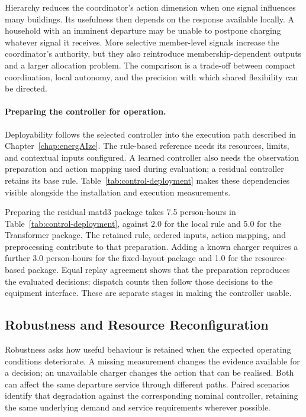 Hierarchy reduces the coordinator's action dimension when one signal influences many buildings. Its usefulness then depends on the response available locally. A household with an imminent departure may be unable to postpone charging whatever signal it receives. More selective member-level signals increase the coordinator's authority, but they also reintroduce membership-dependent outputs and a larger allocation problem. The comparison is a trade-off between compact coordination, local autonomy, and the precision with which shared flexibility can be directed.

\paragraph{Preparing the controller for operation.}
Deployability follows the selected controller into the execution path described in Chapter~\ref{chap:energAIze}. The rule-based reference needs its resources, limits, and contextual inputs configured. A learned controller also needs the observation preparation and action mapping used during evaluation; a residual controller retains its base rule. Table~\ref{tab:control-deployment} makes these dependencies visible alongside the installation and execution measurements.



\illustrativereading Preparing the residual \gls{matd3} package takes 7.5 person-hours in Table~\ref{tab:control-deployment}, against 2.0 for the local rule and 5.0 for the Transformer package. The retained rule, ordered inputs, action mapping, and preprocessing contribute to that preparation. Adding a known charger requires a further 3.0 person-hours for the fixed-layout package and 1.0 for the resource-based package. Equal replay agreement shows that the preparation reproduces the evaluated decisions; dispatch counts then follow those decisions to the equipment interface. These are separate stages in making the controller usable.

\subsection{Robustness and Resource Reconfiguration}
\label{sec:control-disturbance}

Robustness asks how useful behaviour is retained when the expected operating conditions deteriorate. A missing measurement changes the evidence available for a decision; an unavailable charger changes the action that can be realised. Both can affect the same departure service through different paths. Paired scenarios identify that degradation against the corresponding nominal controller, retaining the same underlying demand and service requirements wherever possible.


